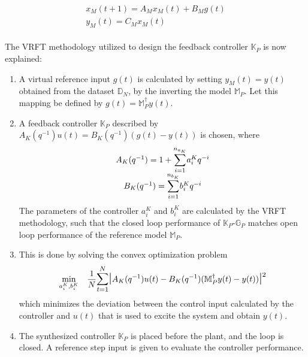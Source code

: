 \documentclass[letterpaper, 10 pt, conference]{ieeeconf}  %
\begin{document}
	\begin{equation*}
	\begin{matrix}
	x_M(t+1) = A_Mx_M(t) + B_Mg(t)\\
	y_M(t) = C_Mx_M(t)
	\end{matrix}
	\end{equation*}\\    
The VRFT methodology utilized to design the feedback controller $\mathbb{K}_P$ is now explained:
\begin{enumerate}
	\item
	A virtual reference input $g(t)$ is calculated by setting $y_M(t)=y(t)$ obtained from the dataset $\mathbb{D}_N$, by the inverting the model $\mathbb{M}_P$. Let this mapping be defined by $g(t) = \mathbb{M}_P^{\dagger}y(t) $.
	\item
	A feedback controller $\mathbb{K}_P$ described by $A_K(q^{-1})u(t) = B_K(q^{-1})(g(t)-y(t))$ is chosen, where 
	\begin{equation*}
	\begin{matrix}
	A_K(q^{-1}) = 1+\mathlarger{\sum\limits_{i=1}^{n_{a_K}}}a_i^Kq^{-i}\\
	B_K(q^{-1}) = \mathlarger{\sum\limits_{i=1}^{n_{b_K}}}b_i^Kq^{-i}
	\end{matrix}  
	\end{equation*}
	The parameters of the controller $a_i^K$ and $b_i^K$ are calculated by the VRFT methodology, such that the closed loop performance of $\mathbb{K}_P$-$\mathbb{G}_P$ matches open loop performance of  the reference model $\mathbb{M}_P$.
	\item
	This is done by solving the convex optimization problem
	\begin{equation*}
	\begin{aligned}
	& \underset{a_i^K,b_i^K}{\text{min}}
	& & \frac{1}{N}\mathlarger{\sum\limits_{t=1}^N}\mathlarger{\mathlarger{|}}A_K(q^{-1})u(t)-B_K(q^{-1})(\mathbb{M}_P^{\dagger}y(t)-y(t))\mathlarger{\mathlarger{|}}^2 \\
	\end{aligned}
	\label{VRFT}
	\end{equation*}
	which minimizes the deviation between the control input calculated by the controller and $u(t)$ that is used to excite the system and obtain $y(t)$.
	\item
	The synthesized controller $\mathbb{K}_P$ is placed before the plant, and the loop is closed. A reference step input is given to evaluate the controller performance.
	\begin{figure}[h]

\end{figure}
\end{enumerate}
\end{document}
